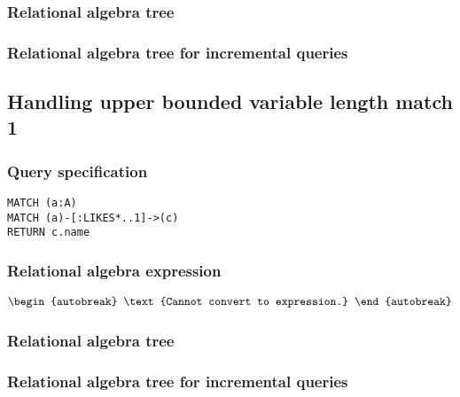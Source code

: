 \subsubsection*{Relational algebra tree}


\subsubsection*{Relational algebra tree for incremental queries}


\subsection{Handling upper bounded variable length match 1}

\subsubsection*{Query specification}

\begin{lstlisting}
MATCH (a:A)
MATCH (a)-[:LIKES*..1]->(c)
RETURN c.name
\end{lstlisting}

\subsubsection*{Relational algebra expression}

\begin{align*}
\begin{autobreak}
\text{Cannot convert to expression.}
\end{autobreak}
\end{align*}

\subsubsection*{Relational algebra tree}


\subsubsection*{Relational algebra tree for incremental queries}


